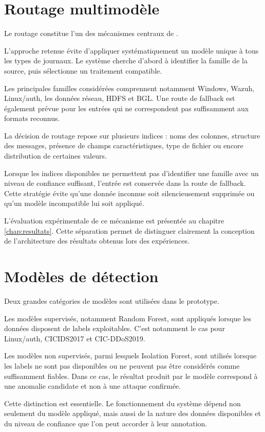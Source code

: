 \section{Routage multimodèle}

Le routage constitue l'un des mécanismes centraux de \logminer{}.

L'approche retenue évite d'appliquer systématiquement un modèle unique à tous les types de journaux. Le système cherche d'abord à identifier la famille de la source, puis sélectionne un traitement compatible.

Les principales familles considérées comprennent notamment Windows, Wazuh, Linux/auth, les données réseau, HDFS et BGL. Une route de fallback est également prévue pour les entrées qui ne correspondent pas suffisamment aux formats reconnus.

La décision de routage repose sur plusieurs indices : noms des colonnes, structure des messages, présence de champs caractéristiques, type de fichier ou encore distribution de certaines valeurs.

Lorsque les indices disponibles ne permettent pas d'identifier une famille avec un niveau de confiance suffisant, l'entrée est conservée dans la route de fallback. Cette stratégie évite qu'une donnée inconnue soit silencieusement supprimée ou qu'un modèle incompatible lui soit appliqué.

L'évaluation expérimentale de ce mécanisme est présentée au chapitre \ref{chap:resultats}. Cette séparation permet de distinguer clairement la conception de l'architecture des résultats obtenus lors des expériences.

\section{Modèles de détection}

Deux grandes catégories de modèles sont utilisées dans le prototype.

Les modèles supervisés, notamment Random Forest, sont appliqués lorsque les données disposent de labels exploitables. C'est notamment le cas pour Linux/auth, CICIDS2017 et CIC-DDoS2019.

Les modèles non supervisés, parmi lesquels Isolation Forest, sont utilisés lorsque les labels ne sont pas disponibles ou ne peuvent pas être considérés comme suffisamment fiables. Dans ce cas, le résultat produit par le modèle correspond à une anomalie candidate et non à une attaque confirmée.

Cette distinction est essentielle. Le fonctionnement du système dépend non seulement du modèle appliqué, mais aussi de la nature des données disponibles et du niveau de confiance que l'on peut accorder à leur annotation.

